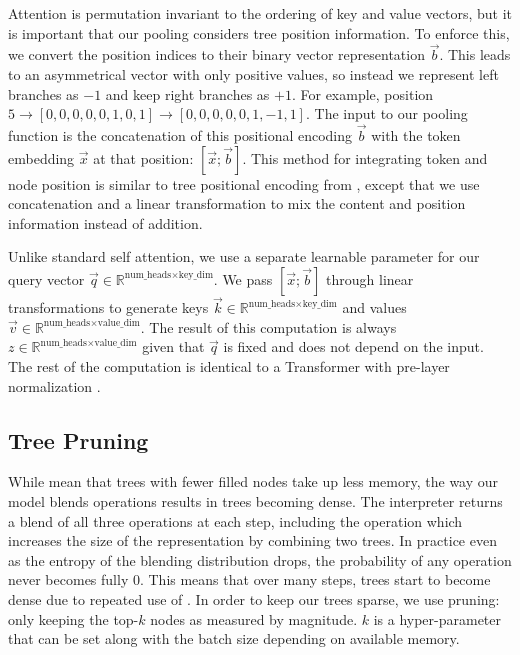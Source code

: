 Attention is permutation invariant to the ordering of key and value vectors, but it is important that our pooling considers tree position information. To enforce this, we convert the position indices to their binary vector representation $\vec{b}$. This leads to an asymmetrical vector with only positive values, so instead we represent left branches as $-1$ and keep right branches as $+1$. For example, position $5 \rightarrow [0,0,0,0,0,1,0,1] \rightarrow [0,0,0,0,0,1,-1,1]$. The input to our pooling function is the concatenation of this positional encoding $\vec{b}$ with the token embedding $\vec{x}$ at that position: $[\vec{x};\vec{b}]$. This method for integrating token and node position is similar to tree positional encoding from \citet{shiv_novel_2019}, except that we use concatenation and a linear transformation to mix the content and position information instead of addition.

Unlike standard self attention, we use a separate learnable parameter for our query vector $\vec{q} \in \mathbb{R}^{\text{num\_heads}\times\text{key\_dim}}$. We pass $[\vec{x};\vec{b}]$ through linear transformations to generate keys $\vec{k} \in \mathbb{R}^{\text{num\_heads}\times\text{key\_dim}}$ and values $\vec{v} \in \mathbb{R}^{\text{num\_heads}\times\text{value\_dim}}$. The result of this computation is always $z \in \mathbb{R}^{\text{num\_heads}\times\text{value\_dim}}$ given that $\vec{q}$ is fixed and does not depend on the input. The rest of the computation is identical to a Transformer with pre-layer normalization \citep{xiong2020layer}.

\subsection{Tree Pruning} \label{sec:sdtm-pruning}
While \fullrepname mean that trees with fewer filled nodes take up less memory, the way our model blends operations results in trees becoming dense.
The interpreter returns a blend of all three operations at each step, including the \cons operation which increases the size of the representation by combining two trees. In practice even as the entropy of the blending distribution drops, the probability of any operation never becomes fully 0. This means that over many steps, trees start to become dense due to repeated use of \cons. In order to keep our trees sparse, we use pruning: only keeping the top-$k$ nodes as measured by magnitude. $k$ is a hyper-parameter that can be set along with the batch size depending on available memory. 

